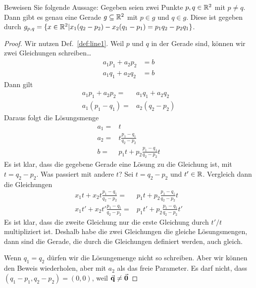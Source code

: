 \begin{Problem}\label{pr:linalg1-3}
	Beweisen Sie folgende Aussage:
Gegeben seien zwei Punkte $p, q \in \mathbb{R}^2$ mit $p \neq  q$. Dann gibt es genau eine Gerade $g \subseteq \mathbb{R}^2$ mit $p \in g$ und $q \in g$. Diese ist gegeben durch $g_{p,q} = \{x \in \mathbb{R}^2 |x_1 (q_2 - p_2 ) - x_2(q_1 - p_1 ) = p_1q_2-  p_2q_1\}$.
\end{Problem}

\begin{proof}
	Wir nutzen Def.~\ref{def:line1}. Weil $p$ und $q$ in der Gerade sind, können wir zwei Gleichungen schreiben\ldots
	\begin{align*}
		a_1p_1+a_2p_2&=b\\
		a_1q_1+a_2q_2&=b
	\end{align*}
	Dann gilt
	\begin{align*}
		a_1p_1+a_2p_2=& a_1q_1+a_2q_2\\
		a_1(p_1-q_1)=& a_2(q_2-p_2)
	\end{align*}
	Daraus folgt die L\"{o}sungsmenge
	\begin{align*}
		a_1=&t\\
		a_2=&t\frac{p_1-q_1}{q_2-p_2}\\
		b=&p_1t+p_2\frac{p_1-q_1}{q_2-p_2}t
	\end{align*}
	Es ist klar, dass die gegebene Gerade eine Lösung zu die Gleichung ist, mit $t=q_2-p_2$. Was passiert mit andere $t$? Sei $t=q_2-p_2$ und $t'\in \mathbb{R}$. Vergleich dann die Gleichungen
	\begin{align*}
		x_1t+x_2t\frac{p_1-q_1}{q_2-p_2}=&p_1t+p_2\frac{p_1-q_1}{q_2-p_2}t\\
		x_1t'+x_2t'\frac{p_1-q_1}{q_2-p_2}=&p_1t'+p_2\frac{p_1-q_1}{q_2-p_2}t'
	\end{align*}
	Es ist klar, dass die zweite Gleichung nur die erste Gleichung durch $t' / t$ multipliziert ist. Deshalb habe die zwei Gleichungen die gleiche Lösungsmengen, dann sind die Gerade, die durch die Gleichungen definiert werden, auch gleich.

Wenn $q_1=q_2$ d\"{u}rfen wir die L\"{o}sungemenge nicht so schreiben. Aber wir k\"{o}nnen den Beweis wiederholen, aber mit $a_2$ als das freie Parameter. Es darf nicht, dass $\left( q_1-p_1,q_2-p_2 \right) =(0,0)$, weil $\va q\neq \va 0$
\end{proof}
